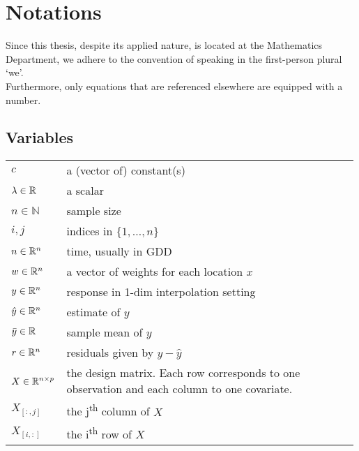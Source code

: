 \chapter*{\vspace{-3.2cm} Notations}
\label{c:Notation}
\vspace{-0.6cm}
Since this thesis, despite its applied nature, is located at the Mathematics Department, we adhere to the convention of speaking in the first-person plural `we'.\\
Furthermore, only equations that are referenced elsewhere are equipped with a number.

\section*{Variables}\vspace{-0.2cm}
\renewcommand{\arraystretch}{1.3} %
\begin{longtable}{p{0.12\linewidth} p{0.87\linewidth}}
$c$		& a (vector of) constant(s)\\
$\lambda \in \mathbb{R}$		& a scalar\\
$n\in \mathbb{N}$		& sample size\\
$i,j$		& indices in $\{1,\dots,n\}$\\
$n\in \mathbb{R}^n$		& time, usually in GDD\\
$w \in \mathbb{R}^n$		& a vector of weights for each location $x$\\
$y\in \mathbb{R}^n$		& response in 1-dim interpolation setting\\
$\hat y\in \mathbb{R}^n$		& estimate of $y$\\
$\bar y\in \mathbb{R}$		& sample mean of $y$\\
$r \in \mathbb{R}^n$		& residuals given by $y - \hat y$\\
$X\in\mathbb{R}^{n\times p}$ & the design matrix. Each row corresponds to one observation and each column to one covariate.\\
$X_{[:,j]}$ 	& the j\textsuperscript{th} column of $X$\\
$X_{[i,:]}$ 	& the i\textsuperscript{th} row of $X$
\end{longtable}

